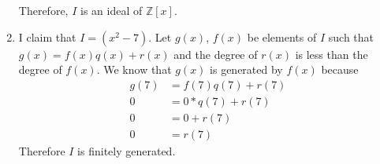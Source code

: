 \documentclass{article}
\begin{document}
\begin{enumerate}
Therefore, $I$ is an ideal of $\mathbb{Z}[x]$.

\item I claim that $I = (x^2 - 7)$.  Let $g(x)$, $f(x)$ be elements of $I$ such
that $g(x) = f(x)q(x)+r(x)$ and the degree of $r(x)$ is less than the degree
of $f(x)$.  We know that $g(x)$ is generated by $f(x)$ because
\begin{align*}
g(7) &= f(7)q(7) + r(7) \\
0 &= 0*q(7) + r(7) \\
0 &= 0 + r(7) \\
0 &= r(7)
\end{align*}
Therefore $I$ is finitely generated.


\end{enumerate}
\end{document}

